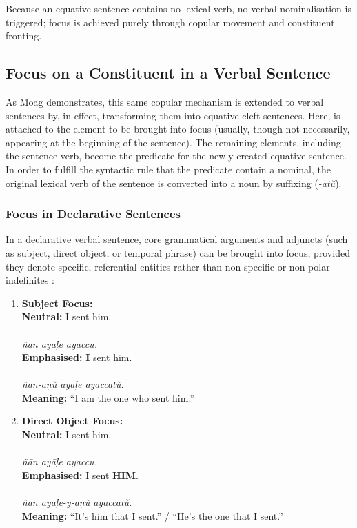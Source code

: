 Because an equative sentence contains no lexical verb, no verbal nominalisation is triggered; focus is achieved purely through copular movement and constituent fronting.

\subsection{Focus on a Constituent in a Verbal Sentence}
As Moag \citep[§11.2, pp.~162--163]{moag2002malayalam} demonstrates, this same copular mechanism is extended to verbal sentences by, in effect, transforming them into equative cleft sentences. Here,  is attached to the element to be brought into focus (usually, though not necessarily, appearing at the beginning of the sentence). The remaining elements, including the sentence verb, become the predicate for the newly created equative sentence. In order to fulfill the syntactic rule that the predicate contain a nominal, the original lexical verb of the sentence is converted into a noun by suffixing  (\textit{-atŭ}).

\subsubsection{Focus in Declarative Sentences}
In a declarative verbal sentence, core grammatical arguments and adjuncts (such as subject, direct object, or temporal phrase) can be brought into focus, provided they denote specific, referential entities rather than non-specific or non-polar indefinites \citep[§11.2, p.~163]{moag2002malayalam}:

\begin{enumerate}[label=\textbf{\arabic*.}]
    \item \textbf{Subject Focus:}\\
    \textbf{Neutral:} I sent him. \citep[§11.2, Ex.~3.A, p.~163]{moag2002malayalam}\\
    \\
    \textit{ñān ayāḷe ayaccu.}\\
    \textbf{Emphasised:} \textbf{I} sent him. \citep[§11.2, Ex.~3.B, p.~163]{moag2002malayalam}\\
    \\
    \textit{ñān-āṇŭ ayāḷe ayaccatŭ.}\\
    \textbf{Meaning:} ``I am the one who sent him.''

    \item \textbf{Direct Object Focus:}\\
    \textbf{Neutral:} I sent him. \citep[§11.2, Ex.~3.A, p.~163]{moag2002malayalam}\\
    \\
    \textit{ñān ayāḷe ayaccu.}\\
    \textbf{Emphasised:} I sent \textbf{HIM}. \citep[§11.2, Ex.~3.C, p.~163]{moag2002malayalam}\\
    \\
    \textit{ñān ayāḷe-y-āṇŭ ayaccatŭ.}\\
    \textbf{Meaning:} ``It's him that I sent.'' / ``He's the one that I sent.''
\end{enumerate}
